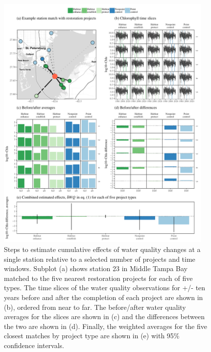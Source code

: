 \documentclass[]{article}
\begin{document}
\begin{figure}
\centerline{\includegraphics[width = 0.95\textwidth]{figs/statex.pdf}}
\caption{Steps to estimate cumulative effects of water quality changes at a single station relative to a selected number of projects and time windows. Subplot (a) shows station 23 in Middle Tampa Bay matched to the five nearest restoration projects for each of five types.  The time slices of the water quality observations for +/- ten years before and after the completion of each project are shown in (b), ordered from near to far.  The before/after water quality averages for the slices are shown in (c) and the differences between the two are shown in (d).  Finally, the weighted averages for the five closest matches by project type are shown in (e) with 95\% confidence intervals. }
\label{fig:statex}
\end{figure}

\clearpage
\end{document}

